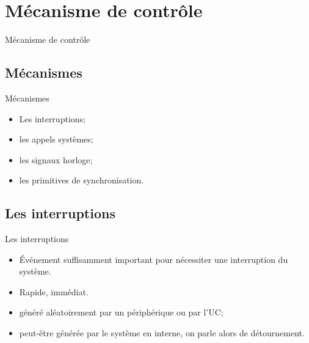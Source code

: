 \def\sectitle{Mécanisme de contrôle}
\section{\sectitle}
\begin{frame}{\sectitle}

\def\subsectitle{Mécanismes}
\subsection{\subsectitle}

\begin{block}{\subsectitle}
\begin{itemize}
    \item Les interruptions;
    \item les appels systèmes;
    \item les signaux horloge;
    \item les primitives de synchronisation.
\end{itemize}
\end{block}


\def\subsectitle{Les interruptions}
\subsection{\subsectitle}

\begin{block}{\subsectitle}
\begin{itemize}
    \item Événement suffisamment important pour nécessiter une interruption du
    système.
    \item Rapide, immédiat.
    \item généré aléatoirement par un périphérique ou par l'UC;
    \item peut-être générée par le système en interne, on parle alors de
    détournement.
\end{itemize}
\end{block}
\end{frame}

